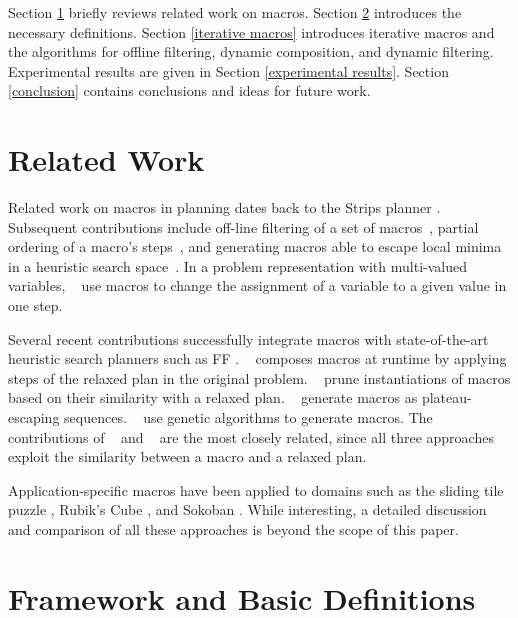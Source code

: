 \documentclass{article}
\begin{document}
Section \ref{related} briefly reviews related work on macros.
Section \ref{background} introduces the necessary definitions.
Section \ref{iterative macros} introduces iterative macros and the
algorithms for offline filtering, dynamic composition, and dynamic filtering.
Experimental results are given in Section \ref{experimental results}.
Section \ref{conclusion} contains conclusions and ideas for future work.

\section{Related Work}
\label{related}
Related work on macros in planning dates back to the {\sc Strips} planner \cite{Fikes:71}.
Subsequent contributions include off-line filtering of a set of macros~\cite{Minton:85},
partial ordering of a macro's steps~\cite{Mooney:88}, and generating macros able
to escape local minima in a heuristic search space~\cite{Iba:89}.
In a problem representation with multi-valued variables,
\citeauthor{McCluskey:97}~ use macros to
change the assignment of a variable to a given value in one step.

Several recent contributions successfully integrate macros  
 with state-of-the-art heuristic search planners such as
{\sc FF} \cite{Hoffmann:01a}.
\citeauthor{Vidal:04}~ composes macros at runtime by
applying steps of the relaxed plan in the original problem.
\citeauthor{Botea:05}~ prune instantiations of 
macros based on their similarity with a relaxed plan.
\citeauthor{Coles:05}~ generate macros
as plateau-escaping sequences.
\citeauthor{Newton:05}~ use genetic algorithms
to generate macros.
The contributions of \citeauthor{Vidal:04}~
and \citeauthor{Botea:05}~ are the most closely
related, since all three approaches
exploit the similarity between a macro and a relaxed plan.

Application-specific macros have
been applied to domains such as the sliding tile puzzle \cite{Korf:85},
Rubik's Cube \cite{Korf:83,Hernadvolgyi:01},
and Sokoban \cite{Junghanns:01}.
While interesting, a detailed discussion and comparison
of all these approaches is beyond the scope of this paper.

\section{Framework and Basic Definitions}
\label{background}
\end{document}

